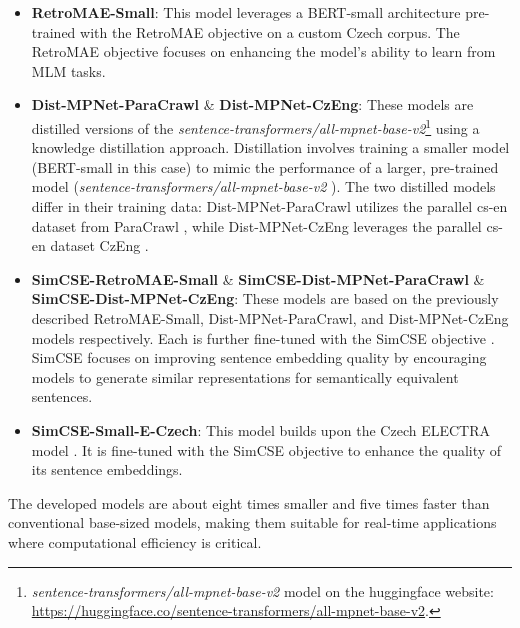 \begin{itemize}
  \item \textbf{RetroMAE-Small}:
    This model leverages a \ac{BERT}-small architecture pre-trained with the \ac{RetroMAE} objective \cite{xiao2022retromae} on a custom Czech corpus.
    The \ac{RetroMAE} objective focuses on enhancing the model's ability to learn from \ac{MLM} tasks.
  \item \textbf{Dist-MPNet-ParaCrawl} \& \textbf{Dist-MPNet-CzEng}:
    These models are distilled versions of the \textit{sentence-transformers/all-mpnet-base-v2}\footnote{\label{hf_all-mpnet-base-v2}\textit{sentence-transformers/all-mpnet-base-v2} model on the huggingface website: \url{https://huggingface.co/sentence-transformers/all-mpnet-base-v2}.} using a knowledge distillation approach.
    Distillation \cite{sanh2020distilbert} involves training a smaller model (\ac{BERT}-small in this case) to mimic the performance of a larger, pre-trained model (\textit{sentence-transformers/all-mpnet-base-v2} ).
    The two distilled models differ in their training data: Dist-MPNet-ParaCrawl utilizes the parallel cs-en dataset from ParaCrawl \cite{espla2019paracrawl}, while Dist-MPNet-CzEng leverages the parallel cs-en dataset CzEng \cite{kocmi2020announcing}.
  \item \textbf{SimCSE-RetroMAE-Small} \& \textbf{SimCSE-Dist-MPNet-ParaCrawl} \& \textbf{SimCSE-Dist-MPNet-CzEng}:
    These models are based on the previously described RetroMAE-Small, Dist-MPNet-ParaCrawl, and Dist-MPNet-CzEng models respectively.
    Each is further fine-tuned with the \ac{SimCSE} objective \cite{gao2022simcse}.
    \ac{SimCSE} focuses on improving sentence embedding quality by encouraging models to generate similar representations for semantically equivalent sentences.
  \item \textbf{SimCSE-Small-E-Czech}:
    This model builds upon the Czech ELECTRA model \cite{kocián2021siamese}.
    It is fine-tuned with the \ac{SimCSE} \cite{gao2022simcse} objective to enhance the quality of its sentence embeddings.    
\end{itemize}

The developed models are about eight times smaller and five times faster than conventional base-sized models, making them suitable for real-time applications where computational efficiency is critical.

